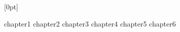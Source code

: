 \documentclass{report}
\begin{document}
$\mathbb{}$



  [0pt]
  {\addvspace{1em}}
  {\bfseries\chaptername\ \thecontentslabel\quad}
  {}
  {\bfseries\hfill\contentspage}
\tableofcontents

\newpage

\newpage
{}
{chapter1}
{chapter2}
{chapter3}
{chapter4}
{chapter5}
{chapter6}
\end{document}
